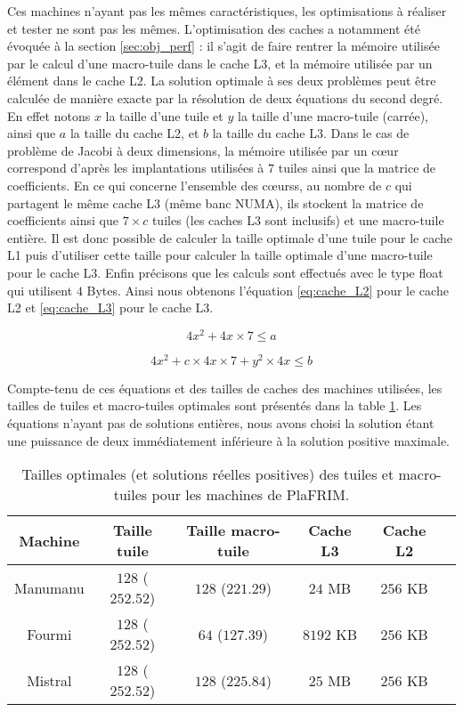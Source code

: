 Ces machines n'ayant pas les mêmes caractéristiques, les optimisations à réaliser et tester ne sont pas les mêmes. L'optimisation des caches a notamment été évoquée à la section \ref{sec:obj_perf} : il s'agit de faire rentrer la mémoire utilisée par le calcul d'une macro-tuile dans le cache L3, et la mémoire utilisée par un élément dans le cache L2. La solution optimale à ses deux problèmes peut être calculée de manière exacte par la résolution de deux équations du second degré. En effet notons $x$ la taille d'une tuile et $y$ la taille d'une macro-tuile (carrée), ainsi que $a$ la taille du cache L2, et $b$ la taille du cache L3. Dans le cas de problème de Jacobi à deux dimensions, la mémoire utilisée par un cœur correspond d'après les implantations utilisées à $7$ tuiles ainsi que la matrice de coefficients. En ce qui concerne l'ensemble des cœurss, au nombre de $c$ qui partagent le même cache L3 (même banc NUMA), ils stockent la matrice de coefficients ainsi que $7 \times c$ tuiles (les caches L3 sont inclusifs) et une macro-tuile entière. Il est donc possible de calculer la taille optimale d'une tuile pour le cache L1 puis d'utiliser cette taille pour calculer la taille optimale d'une macro-tuile pour le cache L3. Enfin précisons que les calculs sont effectués avec le type \textsf{float} qui utilisent $4$ Bytes. Ainsi nous obtenons l'équation \ref{eq:cache_L2} pour le cache L2 et \ref{eq:cache_L3} pour le cache L3.

\begin{equation}
\label{eq:cache_L2}
4x^2 + 4x \times 7 \leq a
\end{equation}

\begin{equation}
\label{eq:cache_L3}
4x^2 + c \times 4x \times 7 + y^2 \times 4x \leq b
\end{equation}

Compte-tenu de ces équations et des tailles de caches des machines utilisées, les tailles de tuiles et macro-tuiles optimales sont présentés dans la table \ref{tab:size_cach}. Les équations n'ayant pas de solutions entières, nous avons choisi la solution étant une puissance de deux immédiatement inférieure à la solution positive maximale.

\begin{table}
{
\caption{Tailles optimales (et solutions réelles positives) des tuiles et macro-tuiles pour les machines de \textsf{PlaFRIM}.}
\label{tab:size_cach}
}
{
\begin{tabular}{||c||c|c|c|c|c||}
\hline
Machine & Taille tuile & Taille macro-tuile & Cache L3 & Cache L2 \\
\hline
\hline
Manumanu & $128$ ($252.52$) & $128$ ($221.29$) & $24$ MB & $256$ KB \\
Fourmi & $128$ ($252.52$) & $64$ ($127.39$) & $8192$ KB & $256$ KB \\
Mistral & $128$ ($252.52$) & $128$ ($225.84$) & $25$ MB & $256$ KB \\
\hline
\end{tabular}
}
\end{table} 


